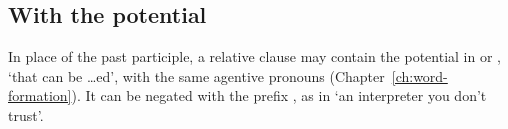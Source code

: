 \subsection{With the potential}
In place of the past participle, a relative clause may contain the potential in  or , `that can be \ldots{}ed', with the same agentive pronouns (Chapter~\ref{ch:word-formation}). It can be negated with the prefix , as in  `an interpreter you don't trust'.

